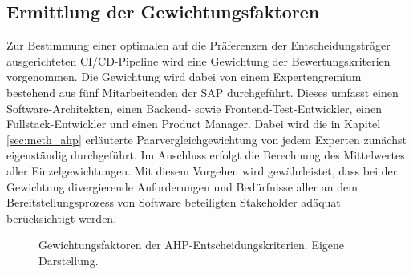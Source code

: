 \subsection{Ermittlung der Gewichtungsfaktoren}
\label{sec:Gewichtung}
Zur Bestimmung einer optimalen auf die Präferenzen der Entscheidungsträger ausgerichteten CI/CD-Pipeline wird eine Gewichtung der Bewertungskriterien vorgenommen. Die Gewichtung wird dabei von einem Expertengremium bestehend aus fünf Mitarbeitenden der SAP durchgeführt. Dieses umfasst einen Software-Architekten, einen Backend- sowie Frontend-Test-Entwickler, einen Fullstack-Entwickler und einen Product Manager. Dabei wird die in Kapitel \ref{sec:meth_ahp} erläuterte Paarvergleichgewichtung von jedem Experten zunächst eigenständig durchgeführt. Im Anschluss erfolgt die Berechnung des Mittelwertes aller Einzelgewichtungen. Mit diesem Vorgehen wird gewährleistet, dass bei der Gewichtung divergierende Anforderungen und Bedürfnisse aller an dem Bereitstellungsprozess von Software beteiligten Stakeholder adäquat berücksichtigt werden.   
\begin{center}
	\begin{figure}[H]
		\centering
		\caption[Gewichtungsfaktoren der AHP-Entscheidungskriterien]{Gewichtungsfaktoren der AHP-Entscheidungskriterien. Eigene Darstellung.}
		\label{fig:AHP_G}
	\end{figure}
\end{center}
\vspace*{-15mm}
